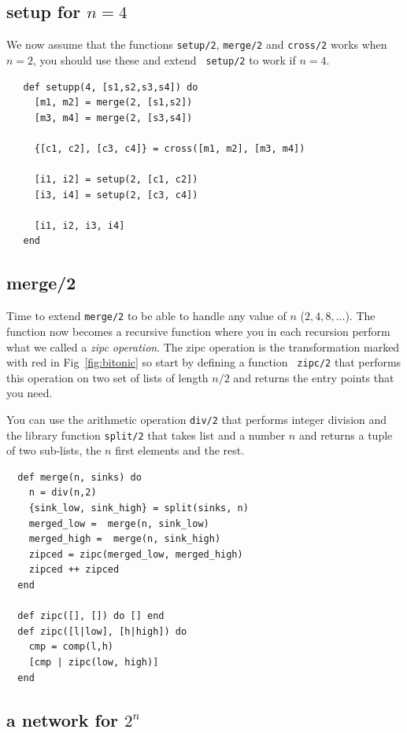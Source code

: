 \documentclass[a4paper,11pt]{article}
\begin{document}
\subsection{setup for $n = 4$}

We now assume that the functions {\tt setup/2}, {\tt merge/2} and
  {\tt cross/2} works when $n=2$, you should use these and extend {\tt
    setup/2} to work if $n = 4$. 

\begin{verbatim}
   def setupp(4, [s1,s2,s3,s4]) do
     [m1, m2] = merge(2, [s1,s2])
     [m3, m4] = merge(2, [s3,s4])

     {[c1, c2], [c3, c4]} = cross([m1, m2], [m3, m4])

     [i1, i2] = setup(2, [c1, c2])
     [i3, i4] = setup(2, [c3, c4])

     [i1, i2, i3, i4]
   end
\end{verbatim}


\subsection{merge/2}


Time to extend {\tt merge/2} to be able to handle any value of $n$
  ($2,4,8,...$). The function now becomes a recursive function where
  you in each recursion perform what we called a {\em zipc
    operation}. The zipc operation is the transformation marked with
  red in Fig~\ref{fig:bitonic} so start by defining a function {\tt
    zipc/2} that performs this operation on two set of lists of length
  $n/2$ and returns the entry points that you need.


You can use the arithmetic operation {\tt div/2} that performs
  integer division and the library function {\tt split/2} that takes
  list and a number $n$ and returns a tuple of two sub-lists, the $n$
  first elements and the rest.

\begin{verbatim}
  def merge(n, sinks) do
    n = div(n,2)
    {sink_low, sink_high} = split(sinks, n)
    merged_low =  merge(n, sink_low)    
    merged_high =  merge(n, sink_high)
    zipced = zipc(merged_low, merged_high)
    zipced ++ zipced
  end  

  def zipc([], []) do [] end
  def zipc([l|low], [h|high]) do
    cmp = comp(l,h)
    [cmp | zipc(low, high)]
  end
  \end{verbatim}

  
\subsection{a network for $2^n$}
\end{document}
